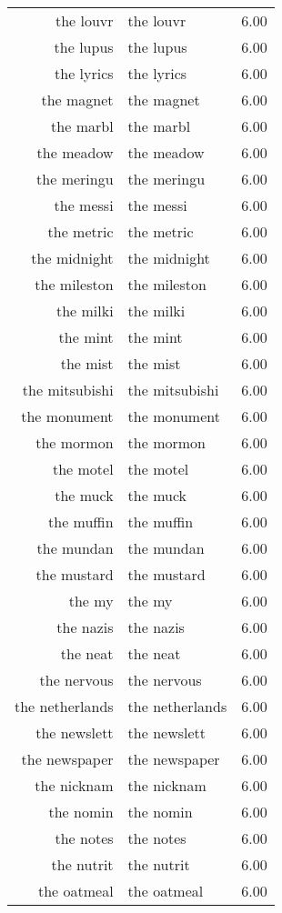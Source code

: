\begin{table}[ht]
\begin{tabular}{rlr}
  the louvr & the louvr & 6.00 \\ 
  the lupus & the lupus & 6.00 \\ 
  the lyrics & the lyrics & 6.00 \\ 
  the magnet & the magnet & 6.00 \\ 
  the marbl & the marbl & 6.00 \\ 
  the meadow & the meadow & 6.00 \\ 
  the meringu & the meringu & 6.00 \\ 
  the messi & the messi & 6.00 \\ 
  the metric & the metric & 6.00 \\ 
  the midnight & the midnight & 6.00 \\ 
  the mileston & the mileston & 6.00 \\ 
  the milki & the milki & 6.00 \\ 
  the mint & the mint & 6.00 \\ 
  the mist & the mist & 6.00 \\ 
  the mitsubishi & the mitsubishi & 6.00 \\ 
  the monument & the monument & 6.00 \\ 
  the mormon & the mormon & 6.00 \\ 
  the motel & the motel & 6.00 \\ 
  the muck & the muck & 6.00 \\ 
  the muffin & the muffin & 6.00 \\ 
  the mundan & the mundan & 6.00 \\ 
  the mustard & the mustard & 6.00 \\ 
  the my & the my & 6.00 \\ 
  the nazis & the nazis & 6.00 \\ 
  the neat & the neat & 6.00 \\ 
  the nervous & the nervous & 6.00 \\ 
  the netherlands & the netherlands & 6.00 \\ 
  the newslett & the newslett & 6.00 \\ 
  the newspaper & the newspaper & 6.00 \\ 
  the nicknam & the nicknam & 6.00 \\ 
  the nomin & the nomin & 6.00 \\ 
  the notes & the notes & 6.00 \\ 
  the nutrit & the nutrit & 6.00 \\ 
  the oatmeal & the oatmeal & 6.00 \\ 

\end{tabular}
\end{table}
